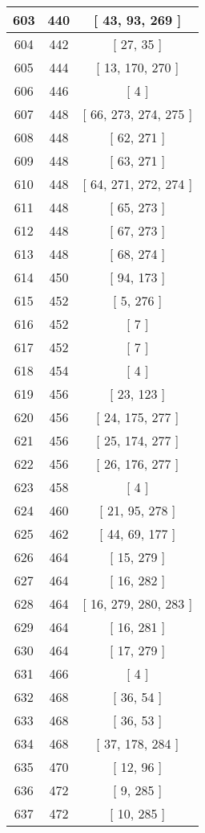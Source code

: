 \begin{center}
\begin{longtable}[H]{|| c c c ||}
\hline
603 & 440 & [ 43, 93, 269 ] \\ 
\hline
604 & 442 & [ 27, 35 ] \\ 
\hline
605 & 444 & [ 13, 170, 270 ] \\ 
\hline
606 & 446 & [ 4 ] \\ 
\hline
607 & 448 & [ 66, 273, 274, 275 ] \\ 
\hline
608 & 448 & [ 62, 271 ] \\ 
\hline
609 & 448 & [ 63, 271 ] \\ 
\hline
610 & 448 & [ 64, 271, 272, 274 ] \\ 
\hline
611 & 448 & [ 65, 273 ] \\ 
\hline
612 & 448 & [ 67, 273 ] \\ 
\hline
613 & 448 & [ 68, 274 ] \\ 
\hline
614 & 450 & [ 94, 173 ] \\ 
\hline
615 & 452 & [ 5, 276 ] \\ 
\hline
616 & 452 & [ 7 ] \\ 
\hline
617 & 452 & [ 7 ] \\ 
\hline
618 & 454 & [ 4 ] \\ 
\hline
619 & 456 & [ 23, 123 ] \\ 
\hline
620 & 456 & [ 24, 175, 277 ] \\ 
\hline
621 & 456 & [ 25, 174, 277 ] \\ 
\hline
622 & 456 & [ 26, 176, 277 ] \\ 
\hline
623 & 458 & [ 4 ] \\ 
\hline
624 & 460 & [ 21, 95, 278 ] \\ 
\hline
625 & 462 & [ 44, 69, 177 ] \\ 
\hline
626 & 464 & [ 15, 279 ] \\ 
\hline
627 & 464 & [ 16, 282 ] \\ 
\hline
628 & 464 & [ 16, 279, 280, 283 ] \\ 
\hline
629 & 464 & [ 16, 281 ] \\ 
\hline
630 & 464 & [ 17, 279 ] \\ 
\hline
631 & 466 & [ 4 ] \\ 
\hline
632 & 468 & [ 36, 54 ] \\ 
\hline
633 & 468 & [ 36, 53 ] \\ 
\hline
634 & 468 & [ 37, 178, 284 ] \\ 
\hline
635 & 470 & [ 12, 96 ] \\ 
\hline
636 & 472 & [ 9, 285 ] \\ 
\hline
637 & 472 & [ 10, 285 ] \\ 

\end{longtable}
\end{center}
